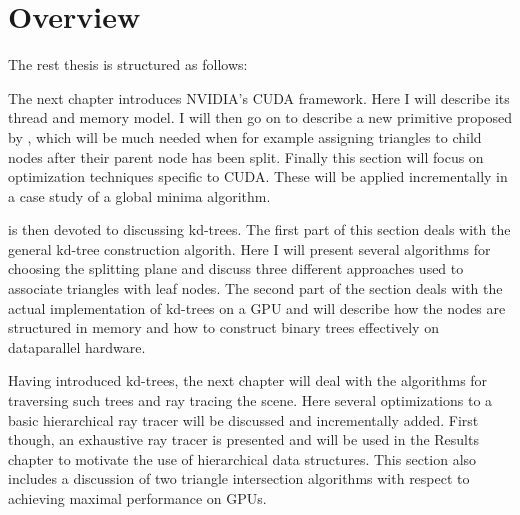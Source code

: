 \section{Overview}

The rest thesis is structured as follows:




The next chapter introduces NVIDIA's CUDA framework. Here I will describe its
thread and memory model. I will then go on to describe a new primitive proposed
by \sengupta{}, which will be much needed when for example assigning triangles
to child nodes after their parent node has been split. Finally this section will
focus on optimization techniques specific to CUDA. These will be applied
incrementally in a case study of a global minima algorithm.


 is then devoted to discussing kd-trees. The first part
of this section deals with the general kd-tree construction algorith. Here I
will present several algorithms for choosing the splitting plane and discuss
three different approaches used to associate triangles with leaf nodes. The
second part of the section deals with the actual implementation of kd-trees on a
GPU and will describe how the nodes are structured in memory and how to
construct binary trees effectively on dataparallel hardware.


Having introduced kd-trees, the next chapter will deal with the algorithms for
traversing such trees and ray tracing the scene. Here several optimizations to a
basic hierarchical ray tracer will be discussed and incrementally added. First
though, an exhaustive ray tracer is presented and will be used in the Results
chapter to motivate the use of hierarchical data structures. This section also
includes a discussion of two triangle intersection algorithms with respect to
achieving maximal performance on GPUs.

